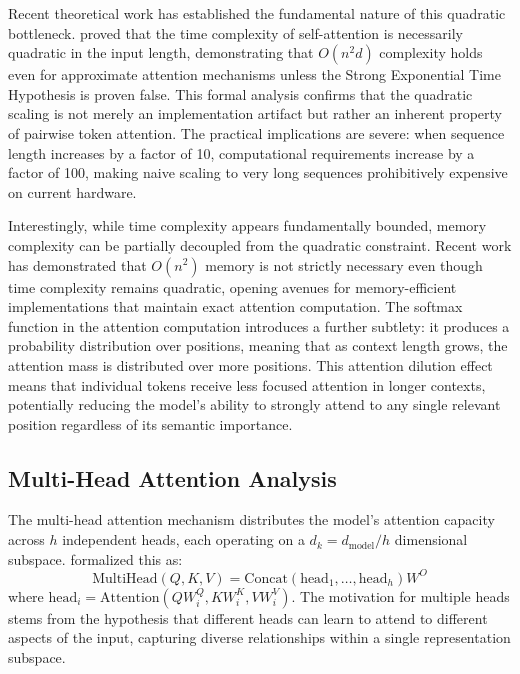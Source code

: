 Recent theoretical work has established the fundamental nature of this quadratic bottleneck. \citet{vaswani2017attention} proved that the time complexity of self-attention is necessarily quadratic in the input length, demonstrating that $O(n^2 d)$ complexity holds even for approximate attention mechanisms unless the Strong Exponential Time Hypothesis is proven false. This formal analysis confirms that the quadratic scaling is not merely an implementation artifact but rather an inherent property of pairwise token attention. The practical implications are severe: when sequence length increases by a factor of 10, computational requirements increase by a factor of 100, making naive scaling to very long sequences prohibitively expensive on current hardware.

Interestingly, while time complexity appears fundamentally bounded, memory complexity can be partially decoupled from the quadratic constraint. Recent work has demonstrated that $O(n^2)$ memory is not strictly necessary even though time complexity remains quadratic, opening avenues for memory-efficient implementations that maintain exact attention computation. The softmax function in the attention computation introduces a further subtlety: it produces a probability distribution over positions, meaning that as context length grows, the attention mass is distributed over more positions. This attention dilution effect means that individual tokens receive less focused attention in longer contexts, potentially reducing the model's ability to strongly attend to any single relevant position regardless of its semantic importance.

\subsection{Multi-Head Attention Analysis}

The multi-head attention mechanism distributes the model's attention capacity across $h$ independent heads, each operating on a $d_k = d_{\text{model}}/h$ dimensional subspace. \citet{vaswani2017attention} formalized this as:
\begin{equation}
\text{MultiHead}(Q, K, V) = \text{Concat}(\text{head}_1, \ldots, \text{head}_h)W^O
\end{equation}
where $\text{head}_i = \text{Attention}(QW_i^Q, KW_i^K, VW_i^V)$. The motivation for multiple heads stems from the hypothesis that different heads can learn to attend to different aspects of the input, capturing diverse relationships within a single representation subspace.


